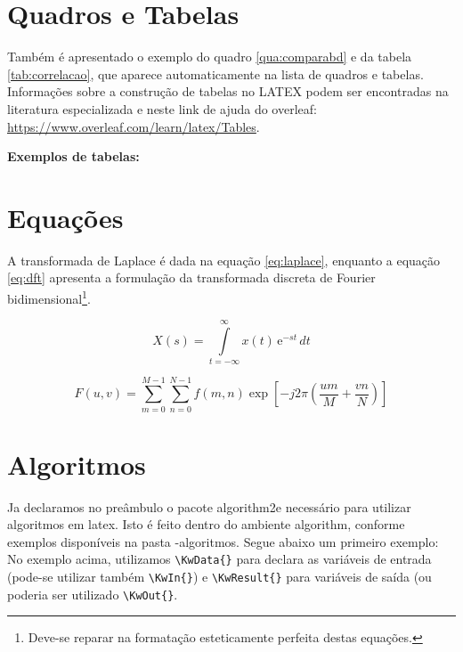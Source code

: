 \section{Quadros e Tabelas}
\label{sec:tabelas}

Também é apresentado o exemplo do quadro \ref{qua:comparabd} e da tabela \ref{tab:correlacao}, que aparece automaticamente na lista de quadros e tabelas.
Informações sobre a construção de tabelas no LATEX podem ser encontradas na literatura especializada e neste link de ajuda do overleaf: \href{https://www.overleaf.com/learn/latex/Tables}{https://www.overleaf.com/learn/latex/Tables}.


\newpage
\textbf{Exemplos de tabelas:
}




\section{Equações}
\label{sec:equacoes}

A transformada de Laplace é dada na equação \ref{eq:laplace}, enquanto a equação \ref{eq:dft} apresenta a formulação da transformada discreta de Fourier bidimensional\footnote{Deve-se reparar na formatação esteticamente perfeita destas equações.}.

\begin{equation}
	X(s) = \int\limits_{t = -\infty}^{\infty} x(t) \, \text{e}^{-st} \, dt
	\label{eq:laplace}
\end{equation}

\begin{equation}
	F(u, v) = \sum_{m = 0}^{M - 1} \sum_{n = 0}^{N - 1} f(m, n) \exp \left[ -j 2 \pi \left( \frac{u m}{M} + \frac{v n}{N} \right) \right]
	\label{eq:dft}
\end{equation}

\section{Algoritmos}
Ja declaramos no preâmbulo o pacote {\ttfamily algorithm2e} necessário para utilizar algoritmos em latex. Isto é feito dentro do ambiente {\ttfamily algorithm}, conforme exemplos  disponíveis na pasta {-algoritmos}. Segue abaixo um primeiro exemplo:\\


No exemplo acima, utilizamos \verb#\KwData{}#  para declara as variáveis de entrada (pode-se utilizar também \verb#\KwIn{}#) e  \verb#\KwResult{}# para variáveis de saída (ou poderia ser utilizado \verb#\KwOut{}#. 

